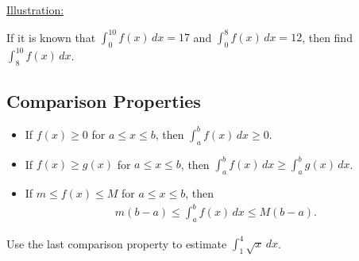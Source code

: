 \documentclass[12pt,a4paper]{article}
\newcounter{example}[section]
\begin{document}
	\underline{Illustration:}
	
	\begin{center}
	\end{center}
	
	\vspace*{16pt}
		
	\begin{example}
	If it is known that $\displaystyle \int_0^{10} f(x) \, dx = 17$ and $\displaystyle \int_0^8 f(x) \, dx = 12$, then find $\int_8^{10} f(x) \, dx$.
	\end{example}
	
	\newpage
	
	\subsection{Comparison Properties}
	\begin{itemize}
	\item If $f(x) \geq 0$ for $a \leq x \leq b$, then $\displaystyle \int_a^b f(x) \, dx \geq 0$.
	\item If $f(x) \geq g(x)$ for $a \leq x \leq b$, then $\displaystyle \int_a^b f(x) \, dx \geq \int_a^b g(x) \, dx$.
	\item If $m \leq f(x) \leq M$ for $a \leq x \leq b$, then
		\begin{align*}
		m (b - a) \leq \int_a^b f(x) \, dx \leq M (b - a) .
		\end{align*}
	\end{itemize}
	
	\vspace*{12pt}
	
	\begin{example}
	Use the last comparison property to estimate $\displaystyle \int_1^4 \sqrt{x} \, dx$.
	\end{example}
\end{document}
